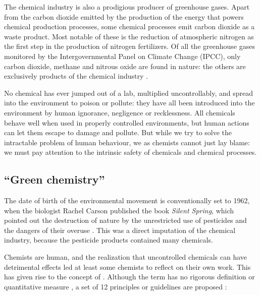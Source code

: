 The chemical industry is also a prodigious producer of greenhouse gases. Apart
from the carbon dioxide emitted by the production of the energy that powers
chemical production processes, some chemical processes emit carbon dioxide as a
waste product. Most notable of these is the reduction of atmospheric nitrogen as
the first step in the production of nitrogen fertilizers. Of all the greenhouse
gases monitored by the Intergovernmental Panel on Climate Change (IPCC), only
carbon dioxide, methane and nitrous oxide are found in nature: the others are
exclusively products of the chemical industry \autocite{IPCC2014}.

No chemical has ever jumped out of a lab, multiplied uncontrollably, and spread
into the environment to poison or pollute: they have all been introduced into
the environment by human ignorance, negligence or recklessness. All chemicals
behave well when used in properly controlled environments, but human actions can
let them escape to damage and pollute. But while we try to solve the
intractable problem of human behaviour, we as chemists cannot just lay blame: we
must pay attention to the intrinsic safety of chemicals and chemical processes.
 
\subsection{``Green chemistry''}
\label{sec:GreenChemistry}
The date of birth of the environmental movement is conventionally set to 1962, when
the biologist Rachel Carson published the book \textit{Silent Spring}, which
pointed out the destruction of nature by the unrestricted use of pesticides and
the dangers of their overuse \autocite{Carson1962}. This was a direct imputation of
the chemical industry, because the pesticide products contained many chemicals.

Chemists are human, and the realization that uncontrolled chemicals can have
detrimental effects led at least some chemists to reflect on their own work.
This has given rise to the concept of . Although the
term has no rigorous definition or quantitative measure
\autocite{Linthorst2010}, a set of 12 principles or guidelines are proposed
\autocite{Anastas1998}:

